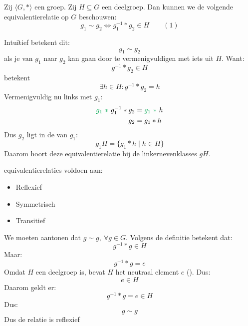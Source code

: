 
Zij $\langle G,* \rangle$ een groep. Zij $H \subseteq G$ een deelgroep. Dan kunnen we de volgende equivalentierelatie op $G$ beschouwen:
\begin{equation*}
    g_1 \sim g_2 \iff g_1^{-1} * g_2 \in H \qquad (1)
\end{equation*}

Intuïtief betekent dit:
\begin{equation*}
    g_1 \sim g_2
\end{equation*}
als je van $g_1$ naar $g_2$ kan gaan door te vermenigvuldigen met iets uit $H$. Want:
\begin{equation*}
    g^{-1} * g_2 \in H
\end{equation*}
betekent
\begin{equation*}
    \exists h \in H : g^{-1} * g_2 = h
\end{equation*}
Vermenigvuldig nu links met $g_1$:
\begin{equation*}
    \begin{aligned}
        \textcolor{Green}{g_1\ *\ } g_1^{-1} * g_2 &= \textcolor{Green}{g_1\ *\ } h \\
        g_2 &= g_1 * h
    \end{aligned}
\end{equation*}
Dus $g_2$ ligt in de  van $g_1$:
\begin{equation*}
    g_1H = \{g_1 * h \mid h \in H\}
\end{equation*}
Daarom hoort deze equivalentierelatie bij de linkernevenklasses $gH$.

 equivalentierelaties voldoen aan:
\begin{itemize}
    \item Reflexief
    \item Symmetrisch
    \item Transitief
\end{itemize}

 We moeten aantonen dat $g \sim g,\ \forall g \in G$. Volgens de definitie betekent dat:
\begin{equation*}
    g^{-1} * g \in H
\end{equation*}
Maar:
\begin{equation*}
    g^{-1} * g = e
\end{equation*}
Omdat $H$ een deelgroep is, bevat $H$ het neutraal element $e$ (). Dus:
\begin{equation*}
    e \in H
\end{equation*}
Daarom geldt er:
\begin{equation*}
    g^{-1} * g = e \in H
\end{equation*}
Dus:
\begin{equation*}
    g \sim g
\end{equation*}
Dus de relatie is reflexief

